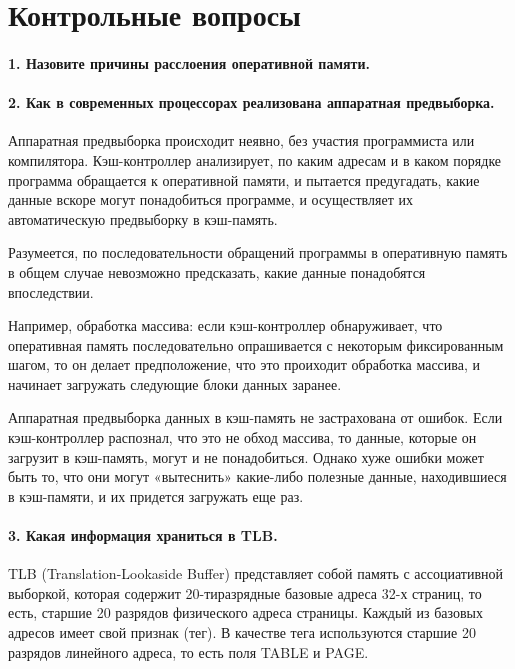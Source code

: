 \chapter*{Контрольные вопросы}

\subsubsection{1. Назовите причины расслоения оперативной памяти.}

\subsubsection{2. Как в современных процессорах реализована аппаратная предвыборка.}

Аппаратная предвыборка происходит неявно, без участия программиста или компилятора. Кэш-контроллер анализирует, по каким адресам и в каком порядке программа обращается к оперативной памяти, и пытается предугадать, какие данные вскоре могут понадобиться программе, и осуществляет их автоматическую предвыборку в кэш-память.

Разумеется, по последовательности обращений программы в оперативную память в общем случае невозможно предсказать, какие данные понадобятся впоследствии.

Например, обработка массива: если кэш-контроллер обнаруживает, что оперативная память последовательно опрашивается с некоторым фиксированным шагом, то он делает предположение, что это проиходит обработка массива, и начинает загружать следующие блоки данных заранее.

Аппаратная предвыборка данных в кэш-память не застрахована от ошибок. Если кэш-контроллер распознал, что это не обход массива, то данные, которые он загрузит в кэш-память, могут и не понадобиться. Однако хуже ошибки может быть то, что они могут «вытеснить» какие-либо полезные данные, находившиеся в кэш-памяти, и их придется загружать еще раз. 

\subsubsection{3. Какая информация храниться в TLB.}
TLB (Translation-Lookaside Buffer) представляет собой память с ассоциативной выборкой, которая содержит 20-тиразрядные базовые адреса 32-х страниц, то есть, старшие 20 разрядов физического адреса страницы. Каждый из базовых адресов имеет свой признак (тег). В качестве тега используются старшие 20 разрядов линейного адреса, то есть поля TABLE и PAGE.

